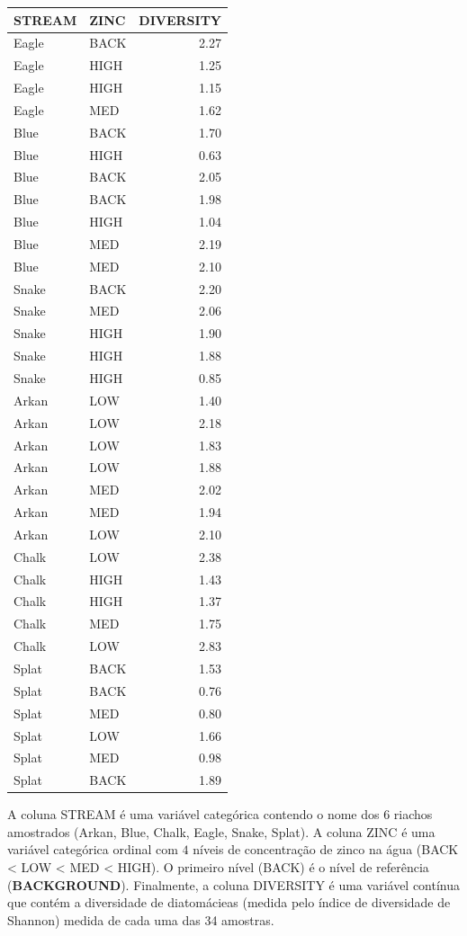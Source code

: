\documentclass[
]{book}
\begin{document}
\begin{tabular}{l|l|r}
\hline
STREAM & ZINC & DIVERSITY\\
\hline
Eagle & BACK & 2.27\\
\hline
Eagle & HIGH & 1.25\\
\hline
Eagle & HIGH & 1.15\\
\hline
Eagle & MED & 1.62\\
\hline
Blue & BACK & 1.70\\
\hline
Blue & HIGH & 0.63\\
\hline
Blue & BACK & 2.05\\
\hline
Blue & BACK & 1.98\\
\hline
Blue & HIGH & 1.04\\
\hline
Blue & MED & 2.19\\
\hline
Blue & MED & 2.10\\
\hline
Snake & BACK & 2.20\\
\hline
Snake & MED & 2.06\\
\hline
Snake & HIGH & 1.90\\
\hline
Snake & HIGH & 1.88\\
\hline
Snake & HIGH & 0.85\\
\hline
Arkan & LOW & 1.40\\
\hline
Arkan & LOW & 2.18\\
\hline
Arkan & LOW & 1.83\\
\hline
Arkan & LOW & 1.88\\
\hline
Arkan & MED & 2.02\\
\hline
Arkan & MED & 1.94\\
\hline
Arkan & LOW & 2.10\\
\hline
Chalk & LOW & 2.38\\
\hline
Chalk & HIGH & 1.43\\
\hline
Chalk & HIGH & 1.37\\
\hline
Chalk & MED & 1.75\\
\hline
Chalk & LOW & 2.83\\
\hline
Splat & BACK & 1.53\\
\hline
Splat & BACK & 0.76\\
\hline
Splat & MED & 0.80\\
\hline
Splat & LOW & 1.66\\
\hline
Splat & MED & 0.98\\
\hline
Splat & BACK & 1.89\\
\hline
\end{tabular}

A coluna STREAM é uma variável categórica contendo o nome dos \(6\) riachos amostrados (Arkan, Blue, Chalk, Eagle, Snake, Splat). A coluna ZINC é uma variável categórica ordinal com \(4\) níveis de concentração de zinco na água (BACK \textless{} LOW \textless{} MED \textless{} HIGH). O primeiro nível (BACK) é o nível de referência (\textbf{BACKGROUND}). Finalmente, a coluna DIVERSITY é uma variável contínua que contém a diversidade de diatomácieas (medida pelo índice de diversidade de Shannon) medida de cada uma das 34 amostras.
\end{document}

